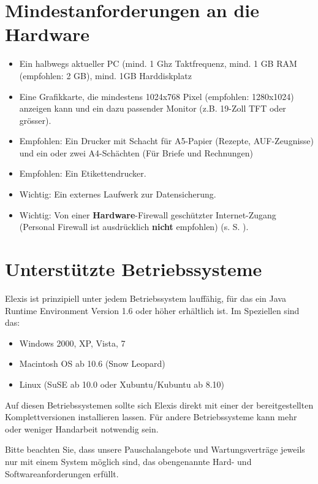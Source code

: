 %

\section{Mindestanforderungen an die Hardware}
\label{systemvoraussetzungen}
\begin{itemize}
 \item Ein halbwegs aktueller PC (mind. 1 Ghz Taktfrequenz, mind. 1 GB RAM
 (empfohlen: 2 GB), mind. 1GB Harddiskplatz
\item  Eine Grafikkarte, die mindestens 1024x768 Pixel (empfohlen: 1280x1024)
anzeigen kann und ein dazu passender Monitor (z.B. 19-Zoll TFT oder grösser).
\item Empfohlen: Ein Drucker mit Schacht für A5-Papier (Rezepte, AUF-Zeugnisse) und ein oder zwei A4-Schächten (Für Briefe und Rechnungen)
\item Empfohlen: Ein Etikettendrucker.
\item Wichtig: Ein externes Laufwerk zur Datensicherung.
\item Wichtig: Von einer \textbf{Hardware}-Firewall geschützter Internet-Zugang (Personal Firewall ist ausdrücklich \textbf{nicht} empfohlen) (s. S. \pageref{sicherheit}).
\end{itemize}

\section{Unterstützte Betriebssysteme}
Elexis ist prinzipiell unter jedem Betriebssystem lauffähig, für das ein Java Runtime Environment Version 1.6
oder höher erhältlich ist. Im Speziellen sind das:
\begin{itemize}
\item  Windows 2000, XP, Vista, 7
\item  Macintosh OS ab 10.6 (Snow Leopard) 
\item Linux (SuSE ab 10.0 oder Xubuntu/Kubuntu ab 8.10)
\end{itemize}
Auf diesen Betriebssystemen sollte sich Elexis direkt mit einer der bereitgestellten Komplettversionen installieren lassen. Für andere Betriebssysteme kann mehr oder weniger Handarbeit notwendig sein.

Bitte beachten Sie, dass unsere Pauschalangebote und Wartungsverträge jeweils nur mit einem System möglich sind, das obengenannte Hard- und  Softwareanforderungen erfüllt. 

